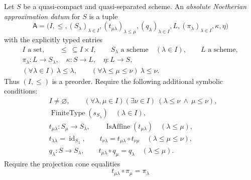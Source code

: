 \begin{definition}
  \label{def:nagata-absolute-noetherian-approximation-datum}
  \leanok

  Let \(S\) be a quasi-compact and quasi-separated scheme.  An
  \emph{absolute Noetherian approximation datum} for \(S\) is a tuple
  \[
    \mathsf A=
    \bigl(I,\leq,(S_\lambda)_{\lambda\in I},
      (t_{\mu\lambda})_{\lambda\leq\mu},
      (q_\lambda)_{\lambda\in I},
      L,(\pi_\lambda)_{\lambda\in I},\kappa,\eta\bigr)              \tag{68}
  \]
  with the explicitly typed entries
  \[
  \begin{gathered}
    I\text{ a set},\qquad {\leq}\ \subseteq I\times I,\qquad
    S_\lambda\text{ a scheme}\quad(\lambda\in I),\qquad
    L\text{ a scheme},\\
    \pi_\lambda\colon L\to S_\lambda,\quad
    \kappa\colon S\to L,\quad \eta\colon L\to S,\\
    (\forall\lambda\in I)\ \lambda\leq\lambda,\qquad
    (\forall\lambda\leq\mu\leq\nu)\ \lambda\leq\nu .
  \end{gathered}                                                     \tag{68a}
  \]
  Thus \((I,\leq)\) is a preorder.  Require the following additional
  symbolic conditions:
  \begin{align}
    &I\neq\varnothing,\qquad
    (\forall\lambda,\mu\in I)(\exists\nu\in I)\ 
      (\lambda\leq\nu\ \wedge\ \mu\leq\nu),                         \tag{69}\\
    &\operatorname{FiniteType}(s_{S_\lambda})
      \quad(\lambda\in I),                                          \tag{70}\\
    &t_{\mu\lambda}\colon S_\mu\to S_\lambda,\qquad
      \operatorname{IsAffine}(t_{\mu\lambda})
      \quad(\lambda\leq\mu),                                        \tag{71}\\
    &t_{\lambda\lambda}=\operatorname{id}_{S_\lambda},\qquad
    t_{\nu\lambda}=t_{\mu\lambda}\circ t_{\nu\mu}
      \quad(\lambda\leq\mu\leq\nu),                                 \tag{72}\\
    &q_\lambda\colon S\to S_\lambda,\qquad
    t_{\mu\lambda}\circ q_\mu=q_\lambda
      \quad(\lambda\leq\mu).                                        \tag{73}
  \end{align}
  Require the projection cone equalities
  \[
    t_{\mu\lambda}\circ\pi_\mu=\pi_\lambda
\]
\end{definition}
